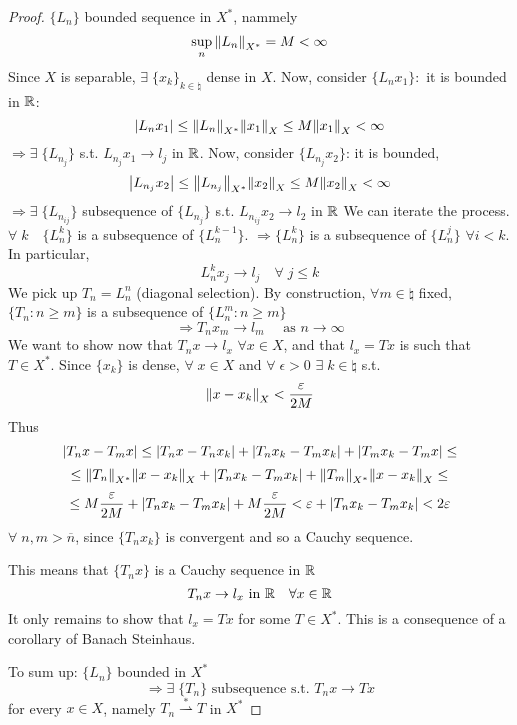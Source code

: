 \begin{proof}
    \(\{L_n\}\) bounded sequence in \(X^*\), nammely
    \[
        \sup_{n} \norm{L_n}_{X^*} = M < \infty
    \]
    Since \(X\) is separable, \(\exists \; \{x_k\}_{k \in \natural}\) dense in \(X\). 
    Now, consider \(\{L_n x_1\}:\) it is bounded in \(\mathbb{R}\):
    \[
        \abs{L_n x_1} \leq \norm{L_n}_{X^*} \norm{x_1}_X \leq M \norm{x_1}_X < \infty
    \]
    \(\Rightarrow \exists \; \{L_{n_j}\}\) s.t. \(L_{n_j} x_1 \to l_j\) in \(\mathbb{R}\). Now, consider \(\{L_{n_j} x_2\}\): it is bounded,
    \[
        \abs{L_{n_j}x_2} \leq \norm{L_{n_j}}_{X^*} \norm{x_2}_X \leq M \norm{x_2}_X < \infty
    \]
    \(\Rightarrow \exists\; \{L_{n_{ij}}\}\) subsequence of \(\{L_{n_j}\}\) s.t. \( L_{n_{ij}} x_2 \to l_2\) in \(\mathbb{R}\)
    We can iterate the process. \(\forall \; k \quad \{L_n^k\}\) is a subsequence of \(\{L_n^{k-1}\}\). \(\Rightarrow \{L_n^k\}\) is a subsequence of \(\{L_n^j\}\) \(\forall i < k\). In particular, 
    \[
        L_n^k x_j \to l_j \quad \forall \; j \leq k
    \]
    We pick up \(T_n = L_n^n\) (diagonal selection). By construction, \(\forall m \in \natural\) fixed, \(\{T_n: n \geq m\}\) is a subsequence of \(\{L_n^m: n \geq m\}\) 
    \[
        \Rightarrow T_n x_m \to l_m \quad \text{ as } n \to \infty
    \]
    We want to show now that \(T_n x \to l_x\) \(\forall x \in X\), and that \(l_x = Tx\) is such that \(T \in X^*\). Since \(\{x_k\}\) is dense, \(\forall \; x \in X\) and \( \forall\; \epsilon >0\) \(\exists\; k \in \natural \) s.t. 
    \[
        \norm{x-x_k}_X < \frac{\varepsilon}{2M}
    \]
    Thus
    \[
        \abs{T_n x - T_m x} \leq \abs{T_n x - T_n x_k} + \abs{T_n x_k - T_m x_k} + \abs{T_m x_k - T_m x} \leq 
    \]
    \[
    \leq \norm{T_n}_{X^*} \norm{x -x_k}_X + \abs{T_n x_k - T_m x_k} + \norm{T_m}_{X^*} \norm{x -x_k}_X \leq
    \]
    \[
        \leq M \frac{\varepsilon}{2M} + \abs{T_n x_k - T_m x_k} + M \frac{\varepsilon}{2M} 
        < \varepsilon + \abs{T_n x_k - T_m x_k} < 2 \varepsilon
    \]
    \(\forall \; n, m > \overline{n}\), since \(\{T_n x_k\}\) is convergent and so a Cauchy sequence.

    This means that \(\{T_n x\}\) is a Cauchy sequence in \(\mathbb{R}\)
    \[
        T_n x \to l_x \text{ in } \mathbb{R} \quad \forall x \in \mathbb{R}
    \]
    It only remains to show that \(l_x = Tx\) for some \(T \in X^*\). This is a consequence of a corollary of Banach Steinhaus.

    To sum up: \(\{L_n\}\) bounded in \(X^*\)
    \[
        \Rightarrow \exists \; \{T_n\} \text{ subsequence s.t. } T_n x \to Tx
    \]
    for every \(x \in X\), namely \(T_n \overset{*}{\rightharpoonup} T\) in \(X^*\)
\end{proof}

